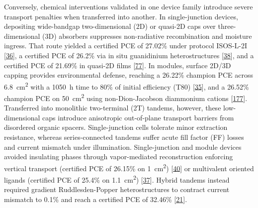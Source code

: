 \documentclass[
  11pt,
]{article}
\begin{document}
Conversely, chemical interventions validated in one device family
introduce severe transport penalties when transferred into another. In
single-junction devices, depositing wide-bandgap two-dimensional (2D) or
quasi-2D caps over three-dimensional (3D) absorbers suppresses
non-radiative recombination and moisture ingress. That route yielded a
certified PCE of 27.02\% under protocol ISOS-L-2I
{[}\href{https://doi.org/10.1038/s41467-026-71845-7}{36}{]}, a certified
PCE of 26.2\% via in situ guanidinium heterostructures
{[}\href{https://doi.org/10.1002/anie.8890696}{38}{]}, and a certified
PCE of 21.69\% in quasi-2D films
{[}\href{https://doi.org/10.1002/adma.72756}{77}{]}. In modules, surface
2D/3D capping provides environmental defense, reaching a 26.22\%
champion PCE across \qty{6.8}{\centi\meter\squared} with a
\qty{1050}{\hour} time to 80\% of initial efficiency (T80)
{[}\href{https://doi.org/10.1007/s40820-025-02058-8}{35}{]}, and a
26.52\% champion PCE on \qty{50}{\centi\meter\squared} using
non-Dion-Jacobson diammonium cations
{[}\href{https://doi.org/10.1002/anie.2974414}{177}{]}. Transferred into
monolithic two-terminal (2T) tandems, however, these low-dimensional
caps introduce anisotropic out-of-plane transport barriers from
disordered organic spacers. Single-junction cells tolerate minor
extraction resistance, whereas series-connected tandems suffer acute
fill factor (FF) losses and current mismatch under illumination.
Single-junction and module devices avoided insulating phases through
vapor-mediated reconstruction enforcing vertical transport (certified
PCE of 26.15\% on \qty{1}{\centi\meter\squared})
{[}\href{https://doi.org/10.1038/s41467-026-72790-1}{40}{]} or
multivalent oriented ligands (certified PCE of 25.4\% on
\qty{1.1}{\centi\meter\squared})
{[}\href{https://doi.org/10.1126/science.aea0656}{37}{]}. Hybrid tandems
instead required gradient Ruddlesden-Popper heterostructures to contract
current mismatch to 0.1\% and reach a certified PCE of 32.46\%
{[}\href{https://doi.org/10.1021/acsenergylett.5c04127}{21}{]}.
\end{document}
